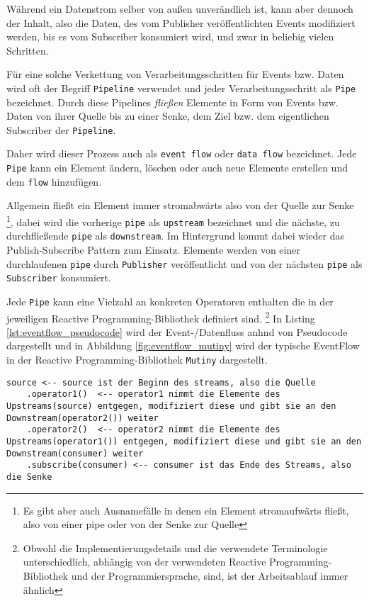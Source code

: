 Während ein Datenstrom selber von außen unverändlich ist, kann aber dennoch der Inhalt, also die Daten,
des vom Publisher veröffentlichten Events modifiziert werden, bis es vom
Subscriber konsumiert wird, und zwar in beliebig vielen Schritten.

Für eine solche Verkettung von Verarbeitungsschritten für Events bzw. Daten
wird oft der Begriff \verb|Pipeline| verwendet und jeder Verarbeitungsschritt als \verb|Pipe| bezeichnet.
Durch diese Pipelines \textit{fließen} Elemente in Form von Events bzw. Daten von ihrer Quelle
bis zu einer Senke, dem Ziel bzw. dem eigentlichen Subscriber der \verb|Pipeline|.

Daher wird dieser Prozess auch als \verb|event flow| oder \verb|data flow| bezeichnet.
Jede \verb|Pipe| kann ein Element ändern, löschen oder auch neue Elemente erstellen und dem \verb|flow| hinzufügen.

Allgemein fließt ein Element immer stromabwärts also von der Quelle zur Senke
\footnote{Es gibt aber auch Ausnamefälle in denen ein Element stromaufwärts fließt, also von einer pipe oder von der Senke zur Quelle},
dabei wird die vorherige \verb|pipe| als \verb|upstream| bezeichnet und die nächste, zu durchfließende \verb|pipe| als \verb|downstream|.
Im Hintergrund kommt dabei wieder das Publish-Subscribe Pattern zum Einsatz. Elemente werden von einer durchlaufenen \verb|pipe| durch \verb|Publisher|
veröffentlicht und von der nächsten \verb|pipe| als \verb|Subscriber| konsumiert.

Jede \verb|Pipe| kann eine Vielzahl an konkreten Operatoren enthalten die in der jeweiligen Reactive Programming-Bibliothek definiert sind.
\footnote{Obwohl die Implementierungsdetails und die verwendete Terminologie unterschiedlich, abhängig von der verwendeten Reactive Programming-Bibliothek
	und der Programmiersprache, sind, ist der Arbeitsablauf immer ähnlich}
In Listing \ref{lst:eventflow_pseudocode} wird der Event-/Datenfluss anhnd von Pseudocode dargestellt und in Abbildung \ref{fig:eventflow_mutiny}
wird der typische EventFlow in der Reactive Programming-Bibliothek \verb|Mutiny| dargestellt.
\begin{lstlisting}[caption=Pseudocode Event-/Datenfluss, captionpos=b, label=lst:eventflow_pseudocode]
source <-- source ist der Beginn des streams, also die Quelle
	.operator1()  <-- operator1 nimmt die Elemente des Upstreams(source) entgegen, modifiziert diese und gibt sie an den Downstream(operator2()) weiter
	.operator2()  <-- operator2 nimmt die Elemente des Upstreams(operator1()) entgegen, modifiziert diese und gibt sie an den Downstream(consumer) weiter
	.subscribe(consumer) <-- consumer ist das Ende des Streams, also die Senke
\end{lstlisting}

